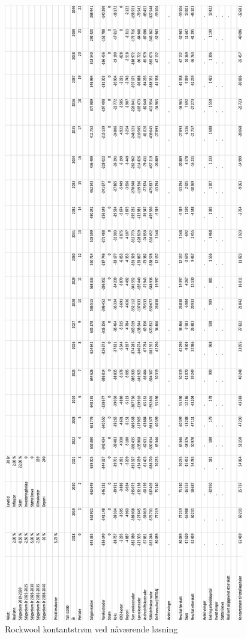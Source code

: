 \begin{figure}[H]
\centering
\includegraphics [scale=0.9]{appendiks/bilder/NNVnow.png}
\caption{Rockwool kontantstrøm ved nåværende løsning}
\label{fig:nnvnow}
\end{figure}

